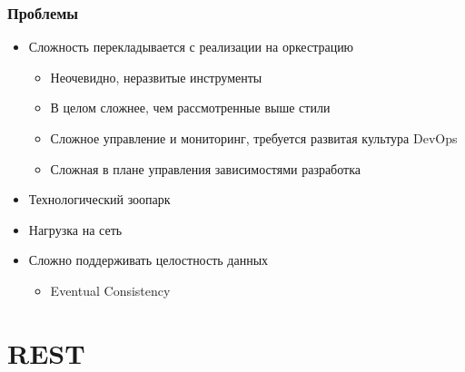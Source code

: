 \documentclass{../mcsslides}
\begin{document}
    \begin{frame}
        \frametitle{Проблемы}
        \begin{itemize}
            \item Сложность перекладывается с реализации на оркестрацию
            \begin{itemize}
                \item Неочевидно, неразвитые инструменты
                \item В целом сложнее, чем рассмотренные выше стили
                \item Сложное управление и мониторинг, требуется развитая культура DevOps
                \item Сложная в плане управления зависимостями разработка
            \end{itemize}
            \item Технологический зоопарк
            \item Нагрузка на сеть
            \item Сложно поддерживать целостность данных
            \begin{itemize}
                \item Eventual Consistency
            \end{itemize}
        \end{itemize}
    \end{frame}

    \section{REST}
    
\end{document}

